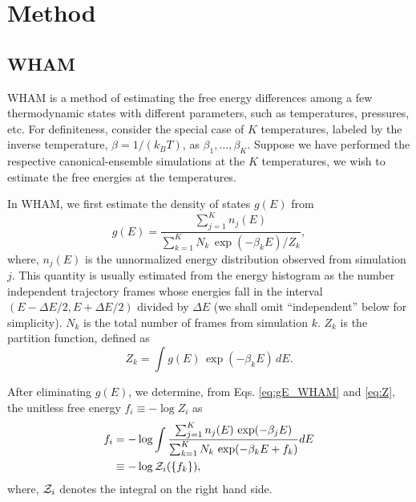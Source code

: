 \documentclass[aip,jcp,preprint,superscriptaddress]{revtex4-1}
\begin{document}
\section{Method}





\subsection{WHAM}



WHAM is a method of
estimating the free energy differences
among a few thermodynamic states
with different parameters,
such as temperatures, pressures, etc.
%
For definiteness,
consider the special case of $K$ temperatures,
labeled by the inverse temperature,
$\beta = 1/(k_B T)$,
as
$\beta_1, \ldots, \beta_K$.
%
Suppose we have performed the respective
canonical-ensemble simulations
at the $K$ temperatures,
we wish to estimate the free energies
at the temperatures.



In WHAM,
we first estimate the density of states $g(E)$ from
%
\begin{equation}
g(E)
=
\frac{
  \sum_{j = 1}^K n_j(E)
}
{
  \sum_{k = 1}^K N_k \, \exp(-\beta_k E) / Z_k
},
\label{eq:gE_WHAM}
\end{equation}
%
where,
$n_j(E)$
is the unnormalized energy distribution
observed from simulation $j$.
%
This quantity is usually estimated
from the energy histogram as
the number independent trajectory frames
whose energies fall in the interval
$(E - \Delta E/2, E + \Delta E/2)$
divided by $\Delta E$
(we shall omit ``independent'' below for simplicity).
%
$N_k$
is the total number of frames
from simulation $k$.
%
$Z_k$
is the partition function,
defined as
%
\begin{equation}
Z_k
=
\int g(E) \, \exp(-\beta_k E) \, dE.
\label{eq:Z}
\end{equation}




After eliminating $g(E)$,
we determine,
from Eqs. \eqref{eq:gE_WHAM} and \eqref{eq:Z},
the unitless free energy
$f_i \equiv -\log Z_i$
as
\begin{align}
f_i
&=
-\log
  \int
    \frac{
      \sum_{j = 1}^K n_j(E) \, \exp(-\beta_j E)
    }
    {
      \sum_{k = 1}^K N_k \, \exp(-\beta_k E + f_k)
    }
    dE
\label{eq:f_WHAM}
\\
&\equiv
-\log \mathcal{Z}_i(\{ f_k \}),
\notag
\end{align}
%
where,
$\mathcal{Z}_i$
denotes the integral on the right hand side.
\end{document}
